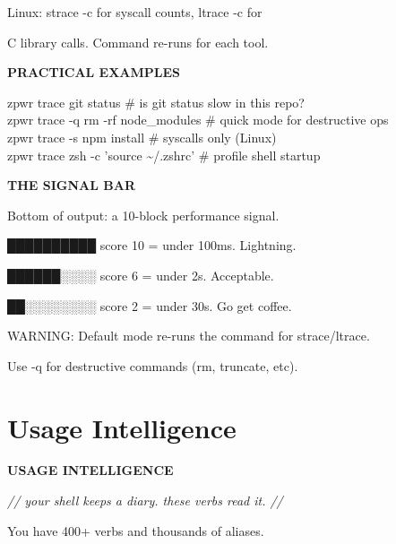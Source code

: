 \documentclass[11pt,a4paper,twoside]{book}
\begin{document}
\begin{codebox}
Linux:  strace -c for syscall counts, ltrace -c for\\
\end{codebox}

C library calls. Command re-runs for each tool.


\vspace{12pt}
{\bfseries\color{neonyellow} PRACTICAL EXAMPLES}\vspace{4pt}

\begin{codebox}
zpwr trace git status              \# is git status slow in this repo?\\
zpwr trace -q rm -rf node\_modules  \# quick mode for destructive ops\\
zpwr trace -s npm install          \# syscalls only (Linux)\\
zpwr trace zsh -c 'source \textasciitilde{}/.zshrc' \# profile shell startup\\
\end{codebox}


\vspace{12pt}
{\bfseries\color{neonyellow} THE SIGNAL BAR}\vspace{4pt}

Bottom of output: a 10-block performance signal.

██████████  score 10 = under 100ms. Lightning.

██████░░░░  score 6  = under 2s. Acceptable.

██░░░░░░░░  score 2  = under 30s. Go get coffee.

WARNING: Default mode re-runs the command for strace/ltrace.

Use -q for destructive commands (rm, truncate, etc).


\vspace{16pt}

\section{Usage Intelligence}


\vspace{10pt}
{\large\bfseries\color{neoncyan} USAGE INTELLIGENCE}\vspace{6pt}

{\small\itshape\color{dimtext} // your shell keeps a diary. these verbs read it. //}

You have 400+ verbs and thousands of aliases.
\end{document}
